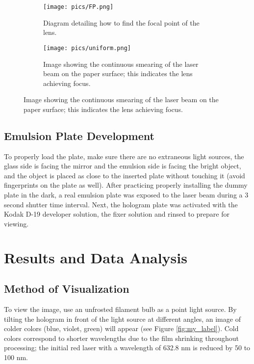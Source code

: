 \documentclass[12pt, letterpaper, twoside]{article}
\begin{document}
\begin{figure}
    \centering
    \begin{subfigure}{0.5\textwidth}
        \centering
        \texttt{[image: pics/FP.png]}
        \caption{Diagram detailing how to find the focal point of the lens.}
        \label{fig:focalpoint}
    \end{subfigure}%
    \begin{subfigure}{0.5\textwidth}
        \centering
        \texttt{[image: pics/uniform.png]}
        \caption{Image showing the continuous smearing of the laser beam on the paper surface; this indicates the lens achieving focus.}
        \label{fig:uniform}
    \end{subfigure}    
\end{figure}

\subsection{Emulsion Plate Development}

To properly load the plate, make sure there are no extraneous light sources, the glass side is facing the mirror and the emulsion side is facing the bright object, and the object is placed as close to the inserted plate without touching it (avoid fingerprints on the plate as well). After practicing properly installing the dummy plate in the dark, a real emulsion plate was exposed to the laser beam during a 3 second shutter time interval. Next, the hologram plate was activated with the Kodak D-19 developer solution, the fixer solution and rinsed to prepare for viewing. 

\section{Results and Data Analysis}


\subsection{Method of Visualization}

To view the image, use an unfrosted filament bulb as a point light source. By tilting the hologram in front of the light source at different angles, an image of colder colors (blue, violet, green) will appear (see Figure \ref{fig:my_label}). Cold colors correspond to shorter wavelengths due to the film shrinking throughout processing; the initial red laser with a wavelength of 632.8 nm is reduced by 50 to 100 nm. 
\end{document}

